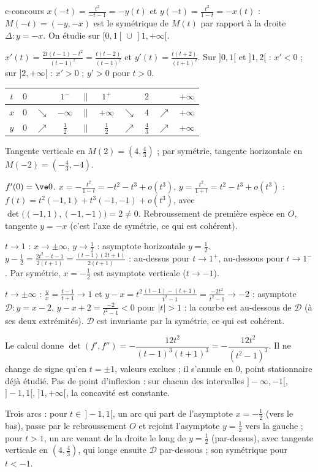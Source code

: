\begin{corrige}{c-concours}
 $x(-t)=\frac{t^2}{-t-1}=-y(t)$ et $y(-t)=\frac{t^2}{1-t}=-x(t)$ : $M(-t)=(-y,-x)$ est le symétrique de $M(t)$ par rapport à la droite $\Delta:y=-x$. On étudie sur $[0,1[\,\cup\,]1,+\infty[$.

 $x'(t)=\frac{2t(t-1)-t^2}{(t-1)^2}=\frac{t(t-2)}{(t-1)^2}$ et $y'(t)=\frac{t(t+2)}{(t+1)^2}$. Sur $]0,1[$ et $]1,2[$ : $x'<0$ ; sur $]2,+\infty[$ : $x'>0$ ; $y'>0$ pour $t>0$.
\begin{center}
\renewcommand{\arraystretch}{1.2}
\begin{tabular}{c|ccccccccc}
$t$ & $0$ & & $1^-$ & $\|$ & $1^+$ & & $2$ & & $+\infty$\\\hline
$x$ & $0$ & $\searrow$ & $-\infty$ & $\|$ & $+\infty$ & $\searrow$ & $4$ & $\nearrow$ & $+\infty$\\
$y$ & $0$ & $\nearrow$ & $\frac12$ & $\|$ & $\frac12$ & $\nearrow$ & $\frac43$ & $\nearrow$ & $+\infty$
\end{tabular}
\end{center}
Tangente verticale en $M(2)=\left(4,\frac43\right)$ ; par symétrie, tangente horizontale en $M(-2)=\left(-\frac43,-4\right)$.

 $f'(0)=\ve0$. $x=-\frac{t^2}{1-t}=-t^2-t^3+o(t^3)$, $y=\frac{t^2}{1+t}=t^2-t^3+o(t^3)$ :
$f(t)=t^2(-1,1)+t^3(-1,-1)+o(t^3)$, avec $\det\big((-1,1),(-1,-1)\big)=2\neq0$. Rebroussement de première espèce en $O$, tangente $y=-x$ (c'est l'axe de symétrie, ce qui est cohérent).

 \emph{$t\to1$} : $x\to\pm\infty$, $y\to\frac12$ : asymptote horizontale $y=\frac12$. $y-\frac12=\frac{2t^2-t-1}{2(t+1)}=\frac{(t-1)(2t+1)}{2(t+1)}$ : au-dessus pour $t\to1^+$, au-dessous pour $t\to1^-$. Par symétrie, $x=-\frac12$ est asymptote verticale ($t\to-1$).

\emph{$t\to\pm\infty$} : $\frac yx=\frac{t-1}{t+1}\to1$ et $y-x=t^2\frac{(t-1)-(t+1)}{t^2-1}=\frac{-2t^2}{t^2-1}\to-2$ : asymptote $\mathcal D:y=x-2$. $y-x+2=\frac{-2}{t^2-1}<0$ pour $|t|>1$ : la courbe est au-dessous de $\mathcal D$ (à ses deux extrémités). $\mathcal D$ est invariante par la symétrie, ce qui est cohérent.

 Le calcul donne $\det(f',f'')=-\dfrac{12t^2}{(t-1)^3(t+1)^3}=-\dfrac{12t^2}{(t^2-1)^3}$. Il ne change de signe qu'en $t=\pm1$, valeurs exclues ; il s'annule en $0$, point stationnaire déjà étudié. Pas de point d'inflexion : sur chacun des intervalles $]-\infty,-1[$, $]-1,1[$, $]1,+\infty[$, la concavité est constante.

 Trois arcs : pour $t\in\,]-1,1[$, un arc qui part de l'asymptote $x=-\frac12$ (vers le bas), passe par le rebroussement $O$ et rejoint l'asymptote $y=\frac12$ vers la gauche ; pour $t>1$, un arc venant de la droite le long de $y=\frac12$ (par-dessus), avec tangente verticale en $\left(4,\frac43\right)$, qui longe ensuite $\mathcal D$ par-dessous ; son symétrique pour $t<-1$.
\end{corrige}

